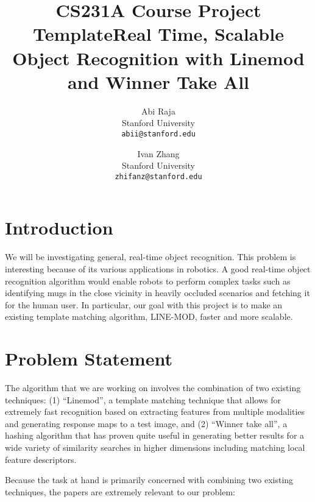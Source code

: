 \documentclass[10pt,twocolumn,letterpaper]{article}
\begin{document}
\title{CS231A Course Project Template}

\title{Real Time, Scalable Object Recognition with Linemod and Winner Take All}
\author{
Abi Raja\\
Stanford University\\
{\tt\small abii@stanford.edu}
\and
Ivan Zhang\\
Stanford University\\
{\tt\small zhifanz@stanford.edu}
}
\maketitle

\maketitle
\thispagestyle{empty}


\section{Introduction}

We will be investigating general, real-time object recognition. This problem is interesting because of its various applications in robotics. A good real-time object recognition algorithm would enable robots to perform complex tasks such as identifying mugs in the close vicinity in heavily occluded scenarios and fetching it for the human user. In particular, our goal with this project is to make an existing template matching algorithm, LINE-MOD, faster and more scalable.

\section{Problem Statement}

The algorithm that we are working on involves the combination of two existing techniques: (1) “Linemod”, a template matching technique that allows for extremely fast recognition based on extracting features from multiple modalities and generating response maps to a test image, and (2) “Winner take all”, a hashing algorithm that has proven quite useful in generating better results for a wide variety of similarity searches in higher dimensions including matching local feature descriptors.

Because the task at hand is primarily concerned with combining two existing techniques, the papers are extremely relevant to our problem:
\end{document}
